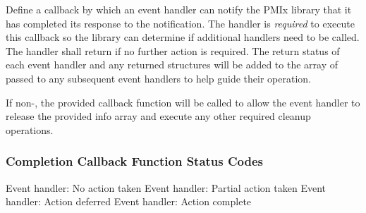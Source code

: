 \descr

Define a callback by which an event handler can notify the \ac{PMIx} library that it has completed its response to the notification. The handler is \textit{required} to execute this callback so the library can determine if additional handlers need to be called. The handler shall return  if no further action is required. The return status of each event handler and any returned  structures will be added to the  array of  passed to any subsequent event handlers to help guide their operation.

If non-, the provided callback function will be called to allow the event handler to release the provided info array and execute any other required cleanup operations.


\subsubsection{Completion Callback Function Status Codes}

\begin{constantdesc}
%
Event handler: No action taken
%
Event handler: Partial action taken
%
Event handler: Action deferred
%
Event handler: Action complete
%
\end{constantdesc}


